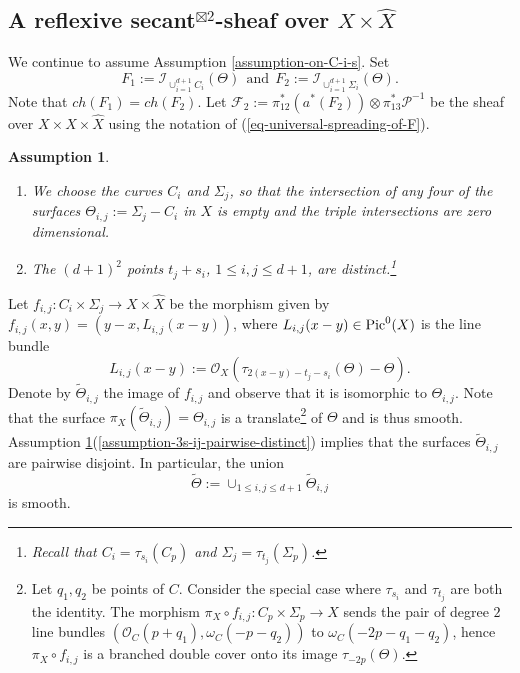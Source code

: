 \documentclass[12pt]{amsart}
\numberwithin{equation}{subsection}
\theoremstyle{plain}
\newtheorem{assumption}[thm]{Assumption}
\theoremstyle{definition}
\newcommand{\F}{{\mathcal F}}
\renewcommand{\P}{{\mathcal P}}
\newcommand{\StructureSheaf}[1]{{\mathcal O}_{#1}}
\newcommand{\Pic}{{\rm Pic}}
\newcommand{\Ideal}[1]{{\mathcal I}_{#1}}
\newcommand{\Choose}[2]
{\left(\!\!\begin{array}{c}#1\\#2\end{array}\!\!\right)}
\begin{document}
{%
}

% 
\subsection{A reflexive secant$^{\boxtimes 2}$-sheaf over $X\times\hat{X}$}
\label{sec-reflexive-secant-square-sheaf}
We continue to assume Assumption \ref{assumption-on-C-i-s}.
Set
\begin{equation}
\label{eq-F-1-and-F-2}
F_1:=\Ideal{\cup_{i=1}^{d+1}C_i}(\Theta) \ \ \mbox{and} \ \ F_2:=\Ideal{\cup_{i=1}^{d+1}\Sigma_i}(\Theta).
\end{equation}
Note that $ch(F_1)=ch(F_2)$.  
Let $\F_2:=\pi_{12}^*(a^*(F_2))\otimes\pi_{13}^*\P^{-1}$ be the sheaf over $X\times X\times\hat{X}$  using the notation of (\ref{eq-universal-spreading-of-F}). 

\begin{assumption}
\label{assumption-intersections-of-surfaces-are-generic}
\begin{enumerate}
\item
\label{assumption-item-intersections-of-surfaces-are-generic}
We choose the curves $C_i$ and $\Sigma_j$, so that the intersection of any four of the surfaces $\Theta_{i,j}:=\Sigma_j-C_i$ in $X$
is empty and the triple intersections are zero dimensional. 
\item
\label{assumption-3s-ij-pairwise-distinct}
The 
$(d+1)^2$ points $t_j+s_i$, $1\leq i,j\leq d+1$, are distinct.\footnote{
Recall that $C_i=\tau_{s_i}(C_p)$ and $\Sigma_j=\tau_{t_j}(\Sigma_p)$.
}
\end{enumerate}
\end{assumption}

Let $f_{i,j}:C_i\times \Sigma_j\rightarrow X\times\hat{X}$ be the morphism given by 
$f_{i,j}(x,y)=(y-x,L_{i,j}(x-y))$, where $L_{i,j}(x-y)\in \Pic^0(X)$ is the line bundle
\begin{equation}
\label{eq-L-i-j}
L_{i,j}(x-y):=\StructureSheaf{X}(\tau_{2(x-y)-t_j-s_i}(\Theta)-\Theta).
\end{equation}
Denote by $\tilde{\Theta}_{i,j}$ the image of $f_{i,j}$ and observe that it is isomorphic to $\Theta_{i,j}$. Note that the surface $\pi_X(\tilde{\Theta}_{i,j})=\Theta_{i,j}$ is a translate\footnote{
Let $q_1, q_2$ be points of $C$. Consider the special case where $\tau_{s_i}$ and $\tau_{t_j}$ are both the identity.
The morphism $\pi_X\circ f_{i,j}:C_p\times \Sigma_p\rightarrow X$ sends the pair of degree $2$ line bundles $(\StructureSheaf{C}(p+q_1),\omega_C(-p-q_2))$ to $\omega_C(-2p-q_1-q_2)$, hence $\pi_X\circ f_{i,j}$ is a branched double cover onto its image $\tau_{-2p}(\Theta)$.
} 
of $\Theta$ and is thus smooth. Assumption \ref{assumption-intersections-of-surfaces-are-generic}(\ref{assumption-3s-ij-pairwise-distinct}) implies that the surfaces $\tilde{\Theta}_{i,j}$ are pairwise disjoint. 
In particular, the union 
\[
\tilde{\Theta}:=\cup_{1\leq i,j\leq d+1}\tilde{\Theta}_{i,j}
\]
is smooth.
\end{document}
